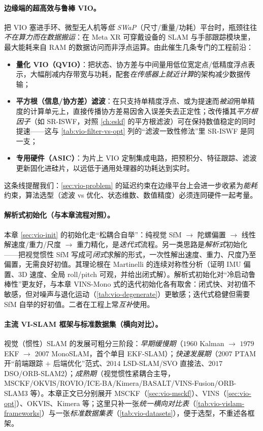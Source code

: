 \paragraph{边缘端的超高效与鲁棒 VIO。}
把 VIO 塞进手环、微型无人机等\emph{低 SWaP}（尺寸/重量/功耗）平台时，瓶颈往往\emph{不在算力而在数据搬运}：在 Meta XR 可穿戴设备的 SLAM 与手部跟踪模块里，最大能耗来自 RAM 的数据访问而非浮点运算\cite{carlone2026handbook}。由此催生几条专门的工程前沿：
\begin{itemize}
  \item \textbf{量化 VIO（QVIO）}：把状态、协方差与中间量用低位宽定点/低精度浮点表示，大幅削减内存带宽与功耗，配套\emph{在传感器上就近计算}的架构减少数据传输；
  \item \textbf{平方根（信息/协方差）滤波}：在只支持单精度浮点、或为提速而\emph{被迫}用单精度的计算单元上，直接传播协方差易因舍入误差失去正定性；改传播其\emph{平方根因子}（如 SR-ISWF，对照 \cref{ch:eskf} 的平方根滤波）可在保持数值稳定的同时提速——这与 \cref{tab:vio-filter-vs-opt} 列的“滤波一致性修法”里 SR-ISWF 是同一支；
  \item \textbf{专用硬件（ASIC）}：为片上 VIO 定制集成电路，把预积分、特征跟踪、滤波更新固化进硅片，以远低于通用处理器的功耗达到实时。
\end{itemize}
这条线提醒我们：\cref{sec:vio-problem} 的延迟约束在边缘平台上会进一步收紧为\emph{能耗}约束，算法选型（滤波 vs 优化、状态维数、数值精度）必须连同硬件一起考量。

\paragraph{解析式初始化（与本章流程对照）。}
本章 \cref{sec:vio-init} 的初始化走“松耦合自举”：纯视觉 SfM $\to$ 陀螺偏置 $\to$ 线性解速度/重力/尺度 $\to$ 重力精化，是\emph{迭代式}流程。另一类思路是\emph{解析式}初始化——把视觉惯性 SfM 写成可\emph{闭式}求解的形式，一次性解出速度、重力、尺度乃至偏置，无需良好初值。其理论根在 Martinelli\cite{martinelli2014closed} 的连续对称性分析（证明 IMU 偏置、3D 速度、全局 roll/pitch 可观，并给出闭式解）。解析式初始化对“冷启动鲁棒性”更友好，与本章 VINS-Mono 式的迭代初始化各有取舍：闭式快、对初值不敏感，但对噪声与退化运动（\cref{tab:vio-degenerate}）更敏感；迭代式稳健但需要 SfM 自举的好初值。二者在工程上常\emph{互补}使用。

\paragraph{主流 VI-SLAM 框架与标准数据集（横向对比）。}
视觉（惯性）SLAM 的发展可粗分三阶段\cite{campos2021orbslam3}：\emph{早期缓慢期}（$1960$ Kalman $\to$ $1979$ EKF $\to$ $2007$ MonoSLAM，首个单目 EKF-SLAM）；\emph{快速发展期}（$2007$ PTAM 开“前端跟踪 $+$ 后端优化”范式、$2014$ LSD-SLAM/SVO 直接法、$2017$ DSO/ORB-SLAM2）；\emph{成熟期}（视觉惯性紧耦合主导，MSCKF/OKVIS/ROVIO/ICE-BA/Kimera/BASALT/VINS-Fusion/ORB-SLAM3 等）。本章正文已分别展开 MSCKF（\cref{sec:vio-msckf}）、VINS（\cref{sec:vio-opt}）、OKVIS、Kimera 等；这里只补一张\emph{统一横向对比表}（\cref{tab:vio-vislam-frameworks}）与一张\emph{标准数据集表}（\cref{tab:vio-datasets}），便于选型，不重述各框架。


